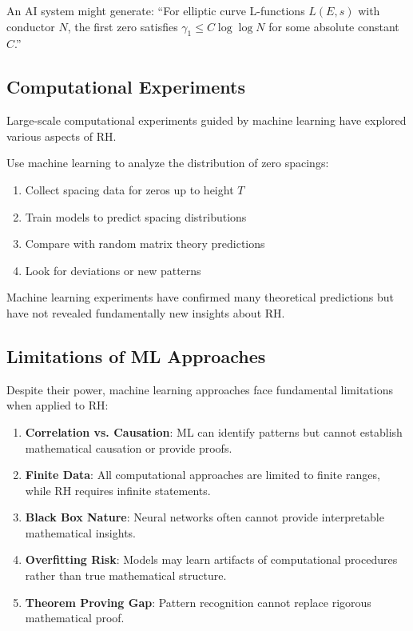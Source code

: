 \begin{example}
\label{ex:ai_conjecture}
An AI system might generate: ``For elliptic curve L-functions $L(E,s)$ with conductor $N$, the first zero satisfies $\gamma_1 \leq C \log \log N$ for some absolute constant $C$.''
\end{example}

\subsection{Computational Experiments}

Large-scale computational experiments guided by machine learning have explored various aspects of RH.

\begin{experiment}
\label{exp:zero_spacing_ml}
Use machine learning to analyze the distribution of zero spacings:
\begin{enumerate}
\item Collect spacing data for zeros up to height $T$
\item Train models to predict spacing distributions
\item Compare with random matrix theory predictions
\item Look for deviations or new patterns
\end{enumerate}
\end{experiment}

\begin{result}
\label{result:computational_ml}
Machine learning experiments have confirmed many theoretical predictions but have not revealed fundamentally new insights about RH.
\end{result}

\subsection{Limitations of ML Approaches}

Despite their power, machine learning approaches face fundamental limitations when applied to RH:

\begin{enumerate}
\item \textbf{Correlation vs. Causation}: ML can identify patterns but cannot establish mathematical causation or provide proofs.

\item \textbf{Finite Data}: All computational approaches are limited to finite ranges, while RH requires infinite statements.

\item \textbf{Black Box Nature}: Neural networks often cannot provide interpretable mathematical insights.

\item \textbf{Overfitting Risk}: Models may learn artifacts of computational procedures rather than true mathematical structure.

\item \textbf{Theorem Proving Gap}: Pattern recognition cannot replace rigorous mathematical proof.
\end{enumerate}

